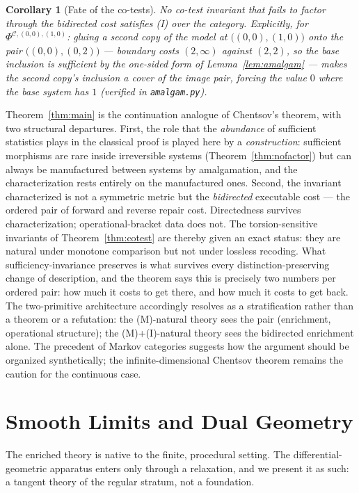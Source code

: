 \documentclass[11pt]{article}
\newtheorem{corollary}[theorem]{Corollary}
\theoremstyle{remark}
\newcommand{\C}{\mathcal{C}}
\begin{document}
\begin{corollary}[Fate of the co-tests]\label{cor:cotest}
No co-test invariant that fails to factor through the bidirected cost
satisfies (I) over the category. Explicitly, for
$\Phi^{\C,(0,0),(1,0)}$: gluing a second copy of the model at
$\bigl((0,0),(1,0)\bigr)$ onto the pair $\bigl((0,0),(0,2)\bigr)$ ---
boundary costs $(2,\infty)$ against $(2,2)$, so the base inclusion is
sufficient by the one-sided form of Lemma~\ref{lem:amalgam} --- makes
the second copy's inclusion a cover of the image pair, forcing the
value $0$ where the base system has $1$ (verified in
\texttt{amalgam.py}).
\end{corollary}

Theorem~\ref{thm:main} is the continuation analogue of Chentsov's
theorem, with two structural departures. First, the role that the
\emph{abundance} of sufficient statistics plays in the classical proof
is played here by a \emph{construction}: sufficient morphisms are
rare inside irreversible systems (Theorem~\ref{thm:nofactor}) but can
always be manufactured between systems by amalgamation, and the
characterization rests entirely on the manufactured ones. Second, the
invariant characterized is not a symmetric metric but the
\emph{bidirected} executable cost --- the ordered pair of forward and
reverse repair cost. Directedness survives characterization;
operational-bracket data does not. The torsion-sensitive invariants of
Theorem~\ref{thm:cotest} are thereby given an exact status: they are
natural under monotone comparison but not under lossless recoding.
What sufficiency-invariance preserves is what survives every
distinction-preserving change of description, and the theorem says
this is precisely two numbers per ordered pair: how much it costs to
get there, and how much it costs to get back. The two-primitive
architecture accordingly resolves as a stratification rather than a
theorem or a refutation: the (M)-natural theory sees the pair
(enrichment, operational structure); the (M)+(I)-natural theory sees
the bidirected enrichment alone. The precedent of Markov categories
\cite{fritz} suggests how the argument should be organized
synthetically; the infinite-dimensional Chentsov theorem \cite{ajls}
remains the caution for the continuous case.

\section{Smooth Limits and Dual Geometry}

The enriched theory is native to the finite, procedural setting. The
differential-geometric apparatus enters only through a relaxation, and
we present it as such: a tangent theory of the regular stratum, not a
foundation.
\end{document}
